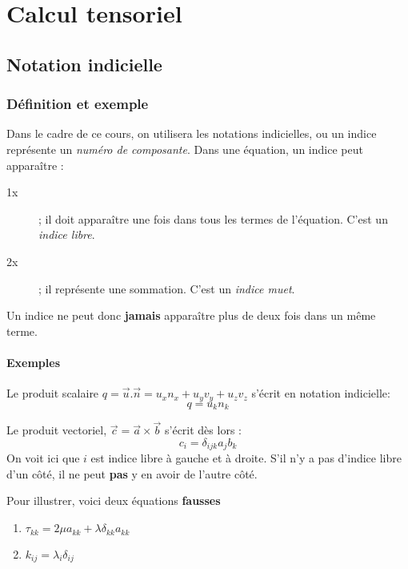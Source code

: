 
\chapter{Calcul tensoriel}
\label{chap:ch1}

\section{Notation indicielle}
\subsection{Définition et exemple}
Dans le cadre de ce cours, on utilisera les notations indicielles, ou un indice représente un 
\textit{numéro de composante}. Dans une équation, un indice peut apparaître :
    
\begin{description}
	\item[1x]; il doit apparaître une fois dans tous les termes de l'équation. C'est un 
	\textit{indice libre}.
	\item[2x]; il représente une sommation. C'est un \textit{indice muet}.
\end{description}
Un indice ne peut donc \textbf{jamais} apparaître plus de deux fois dans un même terme.


\subsubsection{Exemples}
Le produit scalaire $q = \vec{u}.\vec{n} = u_xn_x + u_yv_y+u_zv_z$ s'écrit en notation
indicielle:
\begin{equation}
	q = u_kn_k
\end{equation}
        
Le produit vectoriel, $\vec{c} = \vec{a}\times\vec{b}$ s'écrit dès lors :
\begin{equation}
	c_i = \delta_{ijk}a_jb_k
\end{equation}
On voit ici que $i$ est indice libre à gauche et à droite. S'il n'y a pas d'indice libre
d'un côté, il ne peut \textbf{pas} y en avoir de l'autre côté.
        
Pour illustrer, voici deux équations \textbf{fausses}
\begin{enumerate}
	\item $\tau_{kk} = 2\mu a_{kk} + \lambda\delta_{kk}a_{kk}$
	\item $k_{ij} = \lambda_i\delta_{ij}$
\end{enumerate}
        
